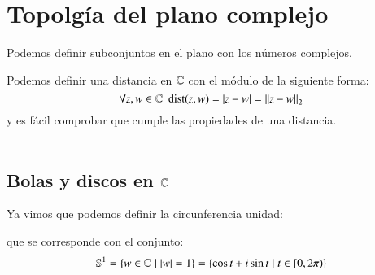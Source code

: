\section{Topolg\'ia del plano complejo}

    Podemos definir subconjuntos en el plano con los números complejos.

    \begin{center}
    \end{center}

    Podemos definir una distancia en $\mathbb{C}$ con el módulo de la siguiente forma:
    $$
        \forall z, w \in \mathbb{C}\ \ \mathrm{dist}(z, w) = \left|z - w\right| = \left|\left|z-w\right|\right|_2
    $$
    y es fácil comprobar que cumple las propiedades de una distancia.\\\\

    \subsection{Bolas y discos en $\mathbb{C}$}
    Ya vimos que podemos definir la circunferencia unidad:\\
    \begin{center}
    \end{center}
    que se corresponde con el conjunto:
    $$
        \mathbb{S}^1 = \left\{w \in \mathbb{C} \mid \left|w\right| = 1\right\} = \left\{\cos t + i \sin t \mid t \in \left[0, 2\pi\right)\right\}
    $$

